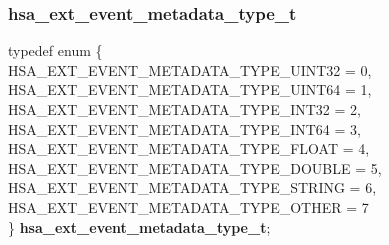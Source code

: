 \documentclass[final,oneside]{book}
\newcommand{\reftyp}[1]{#1}
\newcommand{\refenu}[1]{\reftyp{#1}}
\newenvironment{mylongtable}{\rowcolors{0}{lightgray}{lightgray}\longtable} {
\endlongtable}
\begin{document}
\subsubsection{hsa_\-ext_\-event_\-metadata_\-type_\-t}
\vspace{-2.5mm}\begin{mylongtable}{@{}p{\textwidth}}
\rule{0pt}{3ex}typedef enum \{\\\hspace{1.7em}\hypertarget{group__ext-event-system_1gga11de720b6aa0908d175ed787dddd6acdafcc90e5effc269c340a6f9ee9a07c0e0}{\refenu{HSA_\-EXT_\-EVENT_\-METADATA_\-TYPE_\-UINT32}} = 0,\\
\hspace{1.7em}\hypertarget{group__ext-event-system_1gga11de720b6aa0908d175ed787dddd6acda09b03990e1af08348b73f9a5c7612bb4}{\refenu{HSA_\-EXT_\-EVENT_\-METADATA_\-TYPE_\-UINT64}} = 1,\\
\hspace{1.7em}\hypertarget{group__ext-event-system_1gga11de720b6aa0908d175ed787dddd6acda42c3910dc4a1197827b077088106d43d}{\refenu{HSA_\-EXT_\-EVENT_\-METADATA_\-TYPE_\-INT32}} = 2,\\
\hspace{1.7em}\hypertarget{group__ext-event-system_1gga11de720b6aa0908d175ed787dddd6acda2e6a97e61769de6ff92358caf0e67a8c}{\refenu{HSA_\-EXT_\-EVENT_\-METADATA_\-TYPE_\-INT64}} = 3,\\
\hspace{1.7em}\hypertarget{group__ext-event-system_1gga11de720b6aa0908d175ed787dddd6acda5b4b32b118b71622972d858ad943d5ac}{\refenu{HSA_\-EXT_\-EVENT_\-METADATA_\-TYPE_\-FLOAT}} = 4,\\
\hspace{1.7em}\hypertarget{group__ext-event-system_1gga11de720b6aa0908d175ed787dddd6acda7c7202e26ab326b2ad6d57a7438474f5}{\refenu{HSA_\-EXT_\-EVENT_\-METADATA_\-TYPE_\-DOUBLE}} = 5,\\
\hspace{1.7em}\hypertarget{group__ext-event-system_1gga11de720b6aa0908d175ed787dddd6acda37c6152a30af1cea97c2a1e6c4cb4d7c}{\refenu{HSA_\-EXT_\-EVENT_\-METADATA_\-TYPE_\-STRING}} = 6,\\
\hspace{1.7em}\hypertarget{group__ext-event-system_1gga11de720b6aa0908d175ed787dddd6acda3509ffa46b966e644d62aed4e1fbac34}{\refenu{HSA_\-EXT_\-EVENT_\-METADATA_\-TYPE_\-OTHER}} = 7\\
\} \hypertarget{group__ext-event-system_1ga11de720b6aa0908d175ed787dddd6acd}{\textbf{hsa_\-ext_\-event_\-metadata_\-type_\-t}};\rule[-2ex]{0pt}{0pt}\end{mylongtable}
\end{document}
